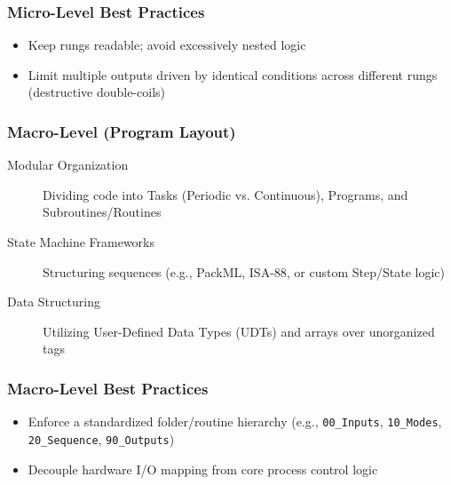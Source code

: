 \begin{frame}
    \frametitle{Micro-Level Best Practices}

    \begin{itemize}
        \item Keep rungs readable; avoid excessively nested logic
        \item Limit multiple outputs driven by identical conditions across different rungs (destructive double-coils)
    \end{itemize}
\end{frame}

\begin{frame}
    \frametitle{Macro-Level (Program Layout)}

    \begin{description}
        \item[Modular Organization] Dividing code into Tasks (Periodic vs. Continuous), Programs, and Subroutines/Routines
        \item[State Machine Frameworks] Structuring sequences (e.g., PackML, ISA-88, or custom Step/State logic)
        \item[Data Structuring] Utilizing User-Defined Data Types (UDTs) and arrays over unorganized tags
    \end{description}
\end{frame}

\begin{frame}
    \frametitle{Macro-Level Best Practices}

    \begin{itemize}
        \item Enforce a standardized folder/routine hierarchy (e.g., \texttt{00\_Inputs}, \texttt{10\_Modes}, \texttt{20\_Sequence}, \texttt{90\_Outputs})
        \item Decouple hardware I/O mapping from core process control logic
    \end{itemize}
\end{frame}

